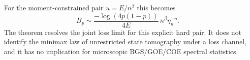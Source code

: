 For the moment-constrained pair $u=E/n^\beta$ this becomes
\[
 B_p\sim\frac{-\log(4p(1-p))}{4E}\,n^\beta\eta_n^{-n}. \tag{PL.9}
\]
The theorem resolves the joint loss limit for this explicit hard pair. It
does not identify the minimax law of unrestricted state tomography under a
loss channel, and it has no implication for microscopic BGS/GOE/COE spectral
statistics.
